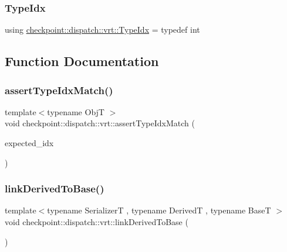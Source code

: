 \subsubsection{\texorpdfstring{Type\+Idx}{TypeIdx}}
{\footnotesize\ttfamily using \hyperlink{namespacecheckpoint_1_1dispatch_1_1vrt_acd3f9e6b091bcfbc23dc35ea8ef45d3b}{checkpoint\+::dispatch\+::vrt\+::\+Type\+Idx} = typedef int}



\subsection{Function Documentation}
\mbox{\label{namespacecheckpoint_1_1dispatch_1_1vrt_a1edd0d1d99a9d53058715b72e8aa7f38}} 
\subsubsection{\texorpdfstring{assert\+Type\+Idx\+Match()}{assertTypeIdxMatch()}}
{\footnotesize\ttfamily template$<$typename ObjT $>$ \\
void checkpoint\+::dispatch\+::vrt\+::assert\+Type\+Idx\+Match (\begin{DoxyParamCaption}\item[{\hyperlink{namespacecheckpoint_1_1dispatch_1_1vrt_acd3f9e6b091bcfbc23dc35ea8ef45d3b}{Type\+Idx} const}]{expected\+\_\+idx }\end{DoxyParamCaption})\hspace{0.3cm}{\ttfamily [inline]}}

\mbox{\label{namespacecheckpoint_1_1dispatch_1_1vrt_a386bc0347756889ae1d3849cf351110e}} 
\subsubsection{\texorpdfstring{link\+Derived\+To\+Base()}{linkDerivedToBase()}}
{\footnotesize\ttfamily template$<$typename SerializerT , typename DerivedT , typename BaseT $>$ \\
void checkpoint\+::dispatch\+::vrt\+::link\+Derived\+To\+Base (\begin{DoxyParamCaption}{ }\end{DoxyParamCaption})\hspace{0.3cm}{\ttfamily [inline]}}

